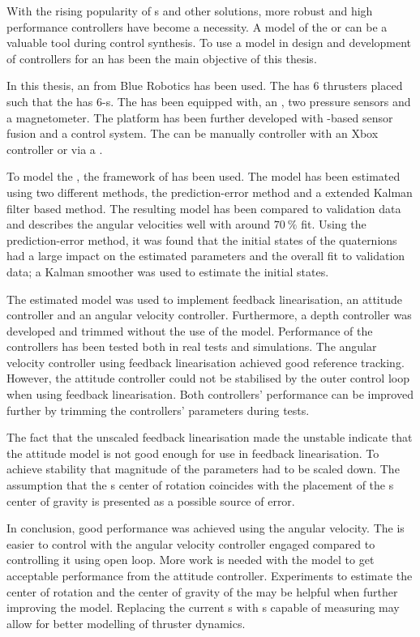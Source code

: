 With the rising popularity of \abbrROV{}s and other \abbrUV solutions, more robust and high performance controllers have become a necessity. A model of the \abbrROV or \abbrUV can be a valuable tool during control synthesis. To use a model in design and development of controllers for an \abbrROV has been the main objective of this thesis.

In this thesis, an \abbrROV from Blue Robotics has been used. The \abbrROV has 6 thrusters placed such that the \abbrROV has 6-\abbrDOF{}s. The \abbrROV has been equipped with, an \abbrIMU , two pressure sensors and a magnetometer. The \abbrROV platform has been further developed with \abbrEKF{}-based sensor fusion and a control system. The \abbrROV can be manually controller with an Xbox controller or via a \abbrGUI. 
 
To model the \abbrROV, the framework of \citet{fossen2011} has been used. The model has been estimated using two different methods, the prediction-error method and a extended Kalman filter based method. The resulting model has been compared to validation data and describes the angular velocities well with around $70\ \%$ fit. Using the prediction-error method, it was found that the initial states of the quaternions had a large impact on the estimated parameters and the overall fit to validation data; a Kalman smoother was used to estimate the initial states. 

The estimated model was used to implement feedback linearisation, an attitude controller and an angular velocity controller. Furthermore, a depth controller was developed and trimmed without the use of the model.  
Performance of the controllers has been tested both in real tests and simulations. The angular velocity controller using feedback linearisation achieved good reference tracking. However, the attitude controller could not be stabilised by the outer control loop when using feedback linearisation. Both controllers' performance can be improved further by trimming the controllers' parameters during tests. 

The fact that the unscaled feedback linearisation made the \abbrROV unstable indicate that the attitude model is not good enough for use in feedback linearisation. To achieve stability that magnitude of the parameters had to be scaled down. The assumption that the \abbrROV{}s center of rotation coincides with the placement of the \abbrROV{}s center of gravity is presented as a possible source of error. 

In conclusion, good performance was achieved using the angular velocity. The \abbrROV is easier to control with the angular velocity controller engaged compared to controlling it using open loop. More work is needed with the model to get acceptable performance from the attitude controller. Experiments to estimate the center of rotation and the center of gravity of the \abbrROV may be helpful when further improving the model. Replacing the current \abbrESC{}s with \abbrESC{}s capable of measuring \abbrRPM may allow for better modelling of thruster dynamics. 

